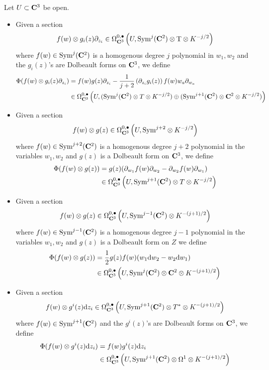 \documentclass[../main.tex]{subfiles}
\begin{document}
Let $U\subset \mathbf{C}^3$ be open. 
\begin{itemize}
\item Given a section
\[
f(w) \otimes g_i(z) \partial_{z_i}\in \Omega^{0,\bullet}_{\mathbf{C}^3} \left (U, \text{Sym}^j(\mathbf{C}^2) \otimes {\mathrm{T}} \otimes K^{-j/2} \right )
\] where $f(w) \in \text{Sym}^j (\mathbf{C}^2)$ is a homogenous degree $j$ polynomial in $w_1,w_2$ and the $g_i(z)$'s are Dolbeault forms on $\mathbf{C}^3$, we define
\begin{align*}
\Phi(f(w) \otimes g_i(z) \partial_{z_i}) &= f(w) g(z) \partial_{z_i} - \frac{1}{j+2} \left(\partial_{z_i} g_i(z)\right) f(w) w_a\partial_{w_a} \\
&\in \Omega^{0,\bullet}_{\mathbf{C}^3} \left ( U, (\text{Sym}^j (\mathbf{C}^2) \otimes T\otimes K^{-j/2} )\oplus ( \text{Sym}^{j+1}(\mathbf{C}^2) \otimes \mathbf{C}^2 \otimes K^{-j/2} ) \right )
\end{align*}

\item Given a section
\[
f(w) \otimes g(z)\in \Omega^{0,\bullet}_{\mathbf{C}^3} \left (U, \text{Sym}^{j+2} \otimes K^{-j/2} \right)
\] where $f(w) \in \text{Sym}^{j+2} (\mathbf{C}^2)$ is a homogenous degree $j+2$ polynomial in the variables $w_1,w_2$ and $g(z)$ is a Dolbeault form on $\mathbf{C}^3$, we define
\begin{align*}
\Phi ( f(w) \otimes g(z) ) &= g(z) (\partial _{w_1} f(w) \partial_{w_2} - \partial _{w_2} f(w) \partial_{w_1} ) \\
&\in \Omega^{0,\bullet}_{\mathbf{C}^3} \left ( U, \text{Sym}^{j+1} (\mathbf{C}^2) \otimes T \otimes K^{-j/2}\right )
\end{align*}

\item Given a section
\[
f(w) \otimes g(z)  \in \Omega^{0,\bullet}_{\mathbf{C}^3} \left (U, \text{Sym}^{j-1}(\mathbf{C}^2) \otimes K^{-(j+1)/2} \right)
\]
where $f(w) \in \text{Sym}^{j-1} (\mathbf{C}^2)$ is a homogenous degree $j-1$ polynomial in the variables $w_1,w_2$ and $g(z)$ is a Dolbeault form on $Z$ we define
\begin{align*}
\Phi( f(w) \otimes g(z) ) &= \frac12 g(z)f(w)(w_1 \mathrm{d} w_2 - w_2 \mathrm{d} w_1)  \\
& \in \Omega^{0,\bullet}_{\mathbf{C}^3}\left  (U, \text{Sym}^j (\mathbf{C}^2) \otimes \mathbf{C}^2 \otimes K^{-(j+1)/2} \right )
\end{align*}

\item
Given a section
\[
f(w) \otimes g^i(z)  \mathrm{d} z_i\in \Omega^{0,\bullet}_{\mathbf{C}^3} \left (U, \text{Sym}^{j+1}(\mathbf{C}^2) \otimes T^* \otimes K^{-(j+1)/2} \right)
\] 
where $f(w) \in \text{Sym}^{j+1} (\mathbf{C}^2)$ and the $g^i(z)$'s are Dolbeault forms on $\mathbf{C}^3$, we define 
\begin{align*}
\Phi(f(w) \otimes g^i(z) \mathrm{d} z_i) & = f(w) g^i (z) \mathrm{d} z_i \\
& \in \Omega^{0,\bullet}_{\mathbf{C}^3} \left (U, \text{Sym}^{j+1} (\mathbf{C}^2) \otimes \Omega^1 \otimes K^{-(j+1)/2} \right )
\end{align*}
\end{itemize}
\end{document}
